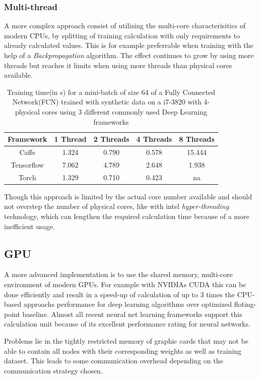 \documentclass[conference]{IEEEtran}
\begin{document}
\subsubsection{Multi-thread}
A more complex approach consist of utilizing the multi-core characterisitics of modern CPUs, by splitting of training calculation with only requirements to already calculated values. This is for example preferrable when training with the help of a \emph{Backpropagation} algorithm. The effect  continues to grow by using more threads but reaches it limits when using more threads than physical cores available.
\begin{table} 
\centering
\begin{tabular}{c c c c c}
\hline
Framework & 1 Thread & 2 Threads &4 Threads & 8 Threads\\\hline
Caffe & 1.324 & 0.790 & 0.578 & 15.444 \\
Tensorflow & 7.062 & 4.789 & 2.648 & 1.938 \\
Torch & 1.329 & 0.710 & 0.423 & na \\\hline
\end{tabular}
\caption{Training time(in s) for a mini-batch of size 64 of a Fully Connected Network(FCN) trained with synthetic data on a i7-3820 with 4-physical cores using 3 different commonly used Deep Learning frameworks\cite{shi2016benchmarking}}
\label{fig_ttfcn}
\end{table}
Though this approach is limited by the actual core number available and should not overstep the number of physical cores, like with intel \emph{hyper-threading} technology, which can lengthen the required calculation time because of a more inefficient usage\cite{shi2016benchmarking}.
\subsection{GPU}
A more advanced implementation is to use the shared memory, multi-core environment of modern GPUs. For example with NVIDIAs CUDA this can be done efficiently and result in a speed-up of calculation of up to 3 times the CPU-based approachs performance for deep learning algorithms over optimized floting-point baseline\cite{shi2016benchmarking}. Almost all recent neural net learning frameworks support this calculation unit because of its excellent performance rating for neural networks.

Problems lie in the tightly restricted memory of graphic cards that may not be able to contain all nodes with their corresponding weights as well as training dataset. This leads to some communication overhead depending on the communication strategy chosen.
\end{document}
